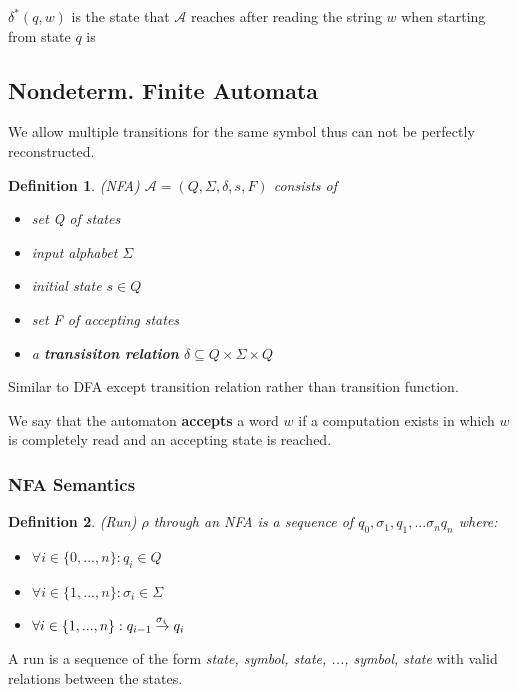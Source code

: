 \documentclass[a3paper, 8pt]{extarticle}
\newtheorem*{definition}{Definition}
\begin{document}
\begin{multicols*}{6}
$\delta^* (q,w)$ is the state that $\mathcal{A}$ reaches after reading the string $w$ when starting from state $q$ is
 

\subsection{Nondeterm. Finite Automata} 
We allow multiple transitions for the same symbol thus can not be perfectly reconstructed.
\begin{definition} (NFA) $\mathcal{A}=(Q, \Sigma, \delta, s, F)$ consists of \begin{itemize}
    \item set Q of states
    \item input alphabet $\Sigma$
    \item initial state $s \in Q$
    \item set F of accepting states
    \item a \textbf{transisiton relation} $\delta \subseteq Q \times \Sigma \times Q$
\end{itemize}
\end{definition}
Similar to DFA except transition relation rather than transition function.

We say that the automaton \textbf{accepts} a word $w$ if a computation exists in which $w$ is completely read and an accepting state is reached.
\subsubsection{NFA Semantics}
    \begin{definition}(Run) $\rho$ through an NFA is a sequence of $q_0, \sigma_1, q_1, ... \sigma_n q_n$ where:
    \begin{itemize}
        \item $\forall i \in \{0, ... , n\} : q_i \in Q$
        \item $\forall i \in \{1, ... , n\} : \sigma_i \in \Sigma$
        \item $\forall i \in \{1, ... , n\} : q_{i-1} \overset{ \sigma_i\vspace{0.1pt} \:}{\to} q_i$
    \end{itemize}
    \end{definition}  A run is a sequence of the form \textit{state, symbol, state, ..., symbol, state} with valid relations between the states.


\end{multicols*}
\end{document}
